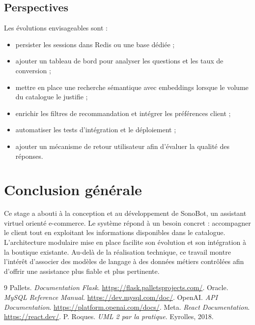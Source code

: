 \documentclass[12pt,a4paper,oneside]{report}
\begin{document}
\section{Perspectives}
Les évolutions envisageables sont :
\begin{itemize}
  \item persister les sessions dans Redis ou une base dédiée ;
  \item ajouter un tableau de bord pour analyser les questions et les taux de conversion ;
  \item mettre en place une recherche sémantique avec embeddings lorsque le volume du catalogue le justifie ;
  \item enrichir les filtres de recommandation et intégrer les préférences client ;
  \item automatiser les tests d'intégration et le déploiement ;
  \item ajouter un mécanisme de retour utilisateur afin d'évaluer la qualité des réponses.
\end{itemize}

\chapter*{Conclusion générale}
Ce stage a abouti à la conception et au développement de SonoBot, un assistant virtuel orienté e-commerce. Le système répond à un besoin concret : accompagner le client tout en exploitant les informations disponibles dans le catalogue. L'architecture modulaire mise en place facilite son évolution et son intégration à la boutique existante. Au-delà de la réalisation technique, ce travail montre l'intérêt d'associer des modèles de langage à des données métiers contrôlées afin d'offrir une assistance plus fiable et plus pertinente.

\begin{thebibliography}{9}
 Pallets. \textit{Documentation Flask}. \url{https://flask.palletsprojects.com/}.
 Oracle. \textit{MySQL Reference Manual}. \url{https://dev.mysql.com/doc/}.
 OpenAI. \textit{API Documentation}. \url{https://platform.openai.com/docs/}.
 Meta. \textit{React Documentation}. \url{https://react.dev/}.
 P. Roques. \textit{UML 2 par la pratique}. Eyrolles, 2018.
\end{thebibliography}
\end{document}
